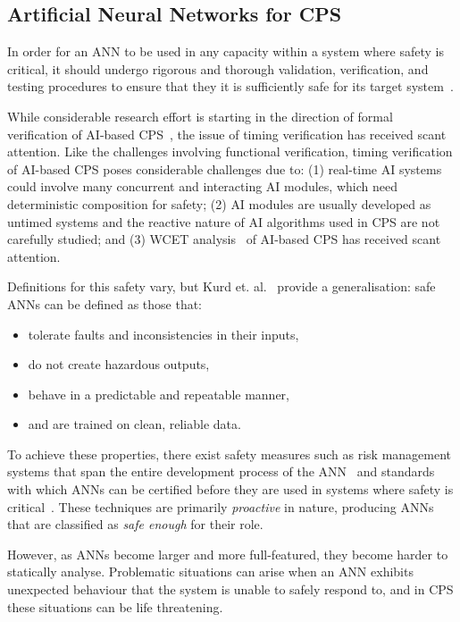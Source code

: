 \subsection{Artificial Neural Networks for \ac{CPS}}
In order for an \ac{ANN} to be used in any capacity within a system where safety is critical, it should undergo rigorous and thorough validation, verification, and testing procedures to ensure that they it is sufficiently safe for its target system~\cite{scann, ANNSafetyLifecycle2003}. 

While considerable research effort is starting in the direction of formal verification of \ac{AI}-based \ac{CPS}~\cite{seshia2016towards, russell2015}, the issue of timing verification has received scant attention. 
Like the challenges involving functional verification, timing verification of AI-based  \ac{CPS} poses considerable challenges due to: (1) real-time \ac{AI} systems could involve many concurrent and interacting \ac{AI} modules, which need deterministic composition for safety; (2) \ac{AI} modules are usually developed as untimed systems and the reactive nature of AI algorithms used in CPS are not carefully studied; and (3) \acf{WCET} analysis~\cite{wilhelm2008worst} of \ac{AI}-based \ac{CPS} has received scant attention.

Definitions for this safety vary, but Kurd et. al.~\cite{EstSafeCriteria2003} provide a generalisation: safe \acp{ANN} can be defined as those that:
\begin{itemize}
	\item tolerate faults and inconsistencies in their inputs,
	\item do not create hazardous outputs,
	\item behave in a predictable and repeatable manner,
	\item and are trained on clean, reliable data. 
\end{itemize}

To achieve these properties, there exist safety measures such as risk management systems that span the entire development process of the \ac{ANN}~\cite{ANNDevModel1999} and standards with which \acp{ANN} can be certified before they are used in systems where safety is critical~\cite{SCANNStandard}. 
These techniques are primarily \textit{proactive} in nature, producing \acp{ANN} that are classified as \textit{safe enough} for their role. 

However, as \acp{ANN} become larger and more full-featured, they  become harder to statically analyse.
Problematic situations can arise when an \ac{ANN} exhibits unexpected behaviour that the system is unable to safely respond to, and in \ac{CPS} these situations can be life threatening.

